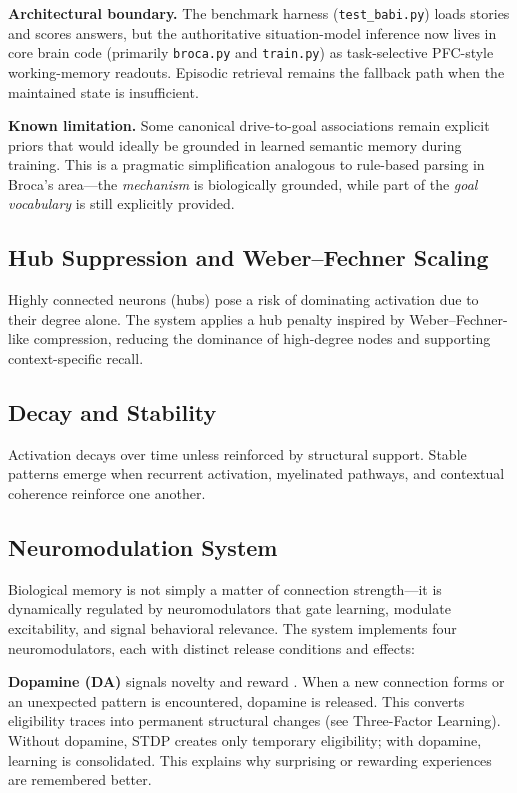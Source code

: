 \documentclass[11pt]{article}
\begin{document}
\noindent\textbf{Architectural boundary.} The benchmark harness (\texttt{test\_babi.py}) loads stories and scores answers, but the authoritative situation-model inference now lives in core brain code (primarily \texttt{broca.py} and \texttt{train.py}) as task-selective PFC-style working-memory readouts. Episodic retrieval remains the fallback path when the maintained state is insufficient.

\noindent\textbf{Known limitation.} Some canonical drive-to-goal associations remain explicit priors that would ideally be grounded in learned semantic memory during training. This is a pragmatic simplification analogous to rule-based parsing in Broca's area---the \emph{mechanism} is biologically grounded, while part of the \emph{goal vocabulary} is still explicitly provided.

\subsection{Hub Suppression and Weber--Fechner Scaling}

Highly connected neurons (hubs) pose a risk of dominating activation due to their
degree alone. The system applies a hub penalty inspired by Weber--Fechner-like compression,
reducing the dominance of high-degree nodes and supporting context-specific recall.

\subsection{Decay and Stability}

Activation decays over time unless reinforced by structural support.
Stable patterns emerge when recurrent activation, myelinated pathways, and
contextual coherence reinforce one another.

\subsection{Neuromodulation System}

Biological memory is not simply a matter of connection strength---it is dynamically regulated by neuromodulators that gate learning, modulate excitability, and signal behavioral relevance. The system implements four neuromodulators, each with distinct release conditions and effects:

\textbf{Dopamine (DA)} signals novelty and reward \citep{schultz1998predictive}. When a new connection forms or an unexpected pattern is encountered, dopamine is released. This converts eligibility traces into permanent structural changes (see Three-Factor Learning). Without dopamine, STDP creates only temporary eligibility; with dopamine, learning is consolidated. This explains why surprising or rewarding experiences are remembered better.
\end{document}
